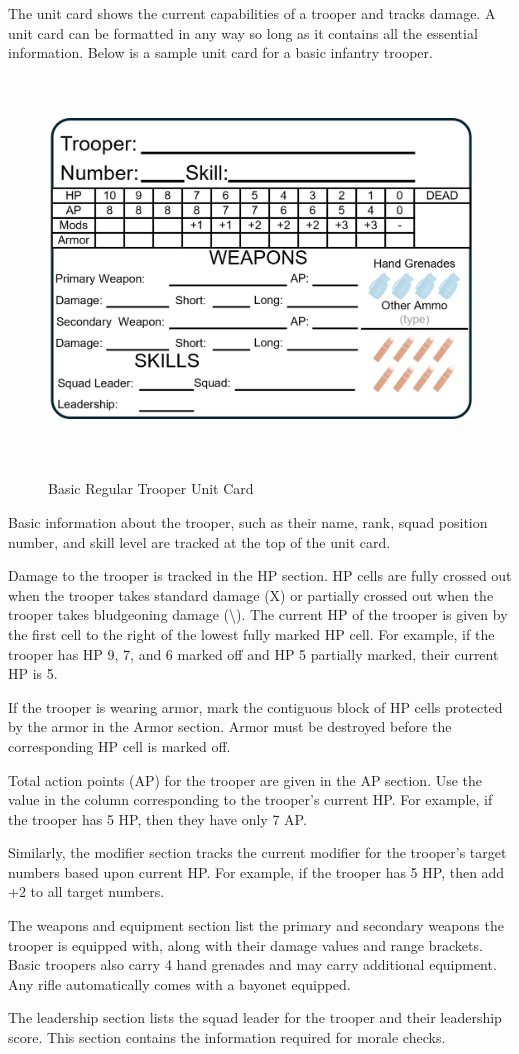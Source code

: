 The unit card shows the current capabilities of a trooper and tracks damage.
A unit card can be formatted in any way so long as it contains all the essential information.
Below is a sample unit card for a basic infantry trooper.

\begin{figure}[!h]
  \centering
  \includegraphics[alt='Sample Regular Trooper', width=5.63in, height=4in]{img/RegularTrooper.png}
  \caption*{Basic Regular Trooper Unit Card}
\end{figure}

Basic information about the trooper, such as their name, rank, squad position number, and skill level are tracked at the top of the unit card.

Damage to the trooper is tracked in the HP section.
HP cells are fully crossed out when the trooper takes standard damage (X) or partially crossed out when the trooper takes bludgeoning damage (\textbackslash).
The current HP of the trooper is given by the first cell to the right of the lowest fully marked HP cell.
For example, if the trooper has HP 9, 7, and 6 marked off and HP 5 partially marked, their current HP is 5.

If the trooper is wearing armor, mark the contiguous block of HP cells protected by the armor in the Armor section.
Armor must be destroyed before the corresponding HP cell is marked off.

Total action points (AP) for the trooper are given in the AP section.
Use the value in the column corresponding to the trooper's current HP.
For example, if the trooper has 5 HP, then they have only 7 AP.

Similarly, the modifier section tracks the current modifier for the trooper's target numbers based upon current HP.
For example, if the trooper has 5 HP, then add +2 to all target numbers.

The weapons and equipment section list the primary and secondary weapons the trooper is equipped with, along with their damage values and range brackets.
Basic troopers also carry 4 hand grenades and may carry additional equipment.
Any rifle automatically comes with a bayonet equipped.

The leadership section lists the squad leader for the trooper and their leadership score.
This section contains the information required for morale checks.
